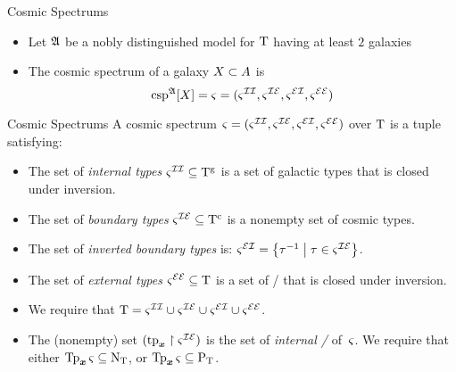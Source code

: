\documentclass{beamer}
\begin{document}
\begin{frame}{Cosmic Spectrums}
\begin{itemize}
  \item Let $\mathfrak{A}$ be a nobly distinguished model for $\mathrm{T}$ having at least $2$
  galaxies
  \item The cosmic spectrum of a galaxy $X\subset A$ is
   \[\operatorname{csp}^{\mathfrak{A}}[X] =
  \varsigma = (\varsigma^{\mathcal{I}\mathcal{I}},\varsigma^{\mathcal{I}\mathcal{E}},\varsigma^{\mathcal{E}\mathcal{I}},\varsigma^{\mathcal{E}\mathcal{E}})\]
\end{itemize}
\end{frame}

\begin{frame}{Cosmic Spectrums}
A cosmic spectrum $\varsigma=(\varsigma^{\mathcal{I}\mathcal{I}},\varsigma^{\mathcal{I}\mathcal{E}},\varsigma^{\mathcal{E}\mathcal{I}},\varsigma^{\mathcal{E}\mathcal{E}})$ over $\mathrm{T}$
is a tuple satisfying:
\begin{itemize}
  \item[\condcspII]\label{cond:cspII}
  The set of \emph{internal types} $\varsigma^{\mathcal{I}\mathcal{I}} \subseteq \mathrm{T}^{\mathrm{g}}$ is a set of
  galactic types that is closed under inversion.
  
  \item[\condcspIE]\label{cond:cspIE}
  The set of \emph{boundary types} $\varsigma^{\mathcal{I}\mathcal{E}} \subseteq \mathrm{T}^{\mathrm{c}}$ is a nonempty set
  of cosmic types.
  
  \item[\condcspEI]\label{cond:cspEI}
  The set of \emph{inverted boundary types} is:
  $\varsigma^{\mathcal{E}\mathcal{I}} = \left\{\tau^{-1}\mathrel{}\middle|\mathrel{}\tau\in\varsigma^{\mathcal{I}\mathcal{E}}\right\}$.
  
  \item[\condcspEE]\label{cond:cspEE}
  The set of \emph{external types} $\varsigma^{\mathcal{E}\mathcal{E}} \subseteq \mathrm{T}$ is a set of
  \twotypes/ that is closed under inversion.

  \item[\condcspT]\label{cond:cspT}
  We require that
  $\mathrm{T} = \varsigma^{\mathcal{I}\mathcal{I}} \cup \varsigma^{\mathcal{I}\mathcal{E}} \cup \varsigma^{\mathcal{E}\mathcal{I}} \cup \varsigma^{\mathcal{E}\mathcal{E}}$.

  \item[\condcspNP]\label{cond:cspNP}
  The (nonempty) set $(\mathrm{tp}_{\bm{x}}\restriction{\varsigma^{\mathcal{I}\mathcal{E}}})$ is
  the set of \emph{internal \onetypes/} of~$\varsigma$.
  We require that either $\operatorname{Tp}_{\bm{x}}{\varsigma} \subseteq {\mathrm{N}}_{\mathrm{T}}$, or $\operatorname{Tp}_{\bm{x}}{\varsigma} \subseteq
  {\mathrm{P}}_{\mathrm{T}}$.
\end{itemize}
\end{frame}
\end{document}
